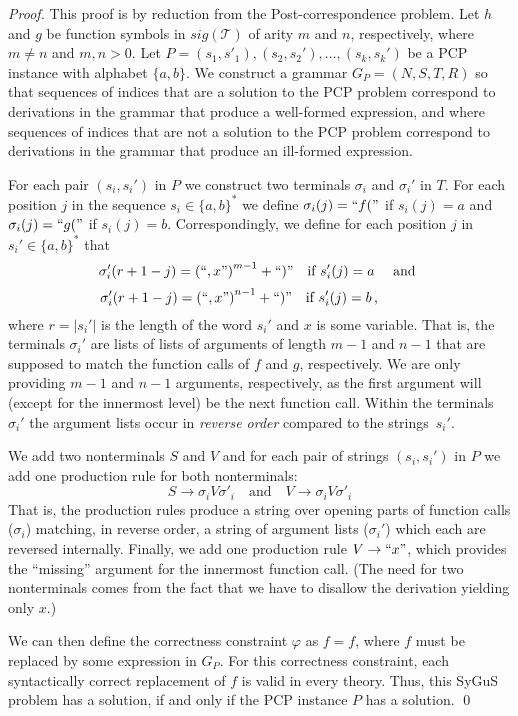 \begin{proof}
This proof is by reduction from the Post-correspondence problem.
Let $h$ and $g$ be function symbols in $sig(\mathcal T)$ of arity $m$ and $n$, respectively, where $m \ne n$ and $m,n>0$.
Let $P = (s_1,s'_1), (s_2,s_2'),\dots,(s_k,s_k')$ be a PCP instance with alphabet $\{a,b\}$. 
We construct a grammar $G_P = (N,S,T,R)$ so that sequences of indices that are a solution to the PCP problem correspond to derivations in the grammar that produce a well-formed expression, and where sequences of indices that are not a solution to the PCP problem correspond to derivations in the grammar that produce an ill-formed expression. 

For each pair $(s_i,s_i')$ in $P$ we construct two terminals $\sigma_i$ and $\sigma_i'$ in $T$. 
For each position $j$ in the sequence $s_i\in\{a,b\}^*$ we define $\sigma_i(j)=``f("$ if $s_i(j)=a$ and $\sigma_i(j)=``g("$ if $s_i(j)=b$. 
Correspondingly, we define for each position $j$ in $s_i'\in\{a,b\}^*$ that 
\[
\sigma_i'(r+1-j)=\left(``,x"\right)^{m-1} + ``)" \quad\text{if }  s_i'(j)=a \quad\text{ and } 
\]
\[
\sigma_i'(r+1-j)=\left(``,x"\right)^{n-1} + ``)"  \quad\text{if }  s_i'(j)=b \,, \qquad\quad
\]
where $r=|s_i'|$ is the length of the word $s_i'$ and $x$ is some variable.
That is, the terminals $\sigma_i'$ are lists of lists of arguments of length $m-1$ and $n-1$ that are supposed to match the function calls of $f$ and $g$, respectively. 
We are only providing $m-1$ and $n-1$ arguments, respectively, as the first argument will (except for the innermost level) be the next function call.
Within the terminals $\sigma_i'$ the argument lists occur in \emph{reverse order} compared to the strings~$s_i'$. 

We add two nonterminals $S$ and $V$ and for each pair of strings $(s_i,s_i')$ in $P$ we add one production rule for both nonterminals:
\[
S \rightarrow \sigma_i V \sigma'_i \quad\text{and}\quad V \rightarrow \sigma_i V \sigma'_i
\]
That is, the production rules produce a string over opening parts of function calls ($\sigma_i$) matching, in reverse order, a string of argument lists ($\sigma_i'$) which each are reversed internally. 
Finally, we add one production rule $V\rightarrow ``x"$, which provides the ``missing'' argument for the innermost function call. 
(The need for two nonterminals comes from the fact that we have to disallow the derivation yielding only $x$.)

We can then define the correctness constraint $\varphi$ as $f = f$, where $f$ must be replaced by some expression in $G_P$. 
For this correctness constraint, each syntactically correct replacement of $f$ is valid in every theory. 
Thus, this SyGuS problem has a solution, if and only if the PCP instance $P$ has a solution. 
\qed
\end{proof}

